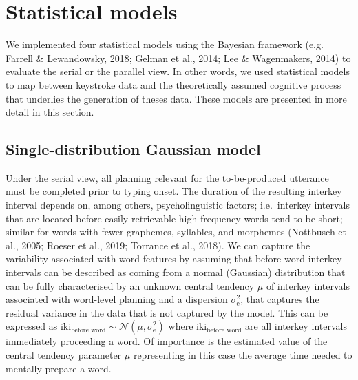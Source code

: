 \documentclass[
  man,floatsintext]{apa7}
\begin{document}
\newpage

\hypertarget{statistical-models}{%
\section{Statistical models}\label{statistical-models}}

We implemented four statistical models using the Bayesian framework (e.g. Farrell \& Lewandowsky, 2018; Gelman et al., 2014; Lee \& Wagenmakers, 2014) to evaluate the serial or the parallel view. In other words, we used statistical models to map between keystroke data and the theoretically assumed cognitive process that underlies the generation of theses data. These models are presented in more detail in this section.

\hypertarget{single-distribution-gaussian-model}{%
\subsection{Single-distribution Gaussian model}\label{single-distribution-gaussian-model}}

Under the serial view, all planning relevant for the to-be-produced utterance must be completed prior to typing onset. The duration of the resulting interkey interval depends on, among others, psycholinguistic factors; i.e.~interkey intervals that are located before easily retrievable high-frequency words tend to be short; similar for words with fewer graphemes, syllables, and morphemes (Nottbusch et al., 2005; Roeser et al., 2019; Torrance et al., 2018). We can capture the variability associated with word-features by assuming that before-word interkey intervals can be described as coming from a normal (Gaussian) distribution that can be fully characterised by an unknown central tendency \(\mu\) of interkey intervals associated with word-level planning and a dispersion \(\sigma_\text{e}^2\), that captures the residual variance in the data that is not captured by the model. This can be expressed as \(\text{iki}_\text{before word} \sim \mathcal{N}(\mu, \sigma_\text{e}^2)\) where \(\text{iki}_\text{before word}\) are all interkey intervals immediately proceeding a word. Of importance is the estimated value of the central tendency parameter \(\mu\) representing in this case the average time needed to mentally prepare a word.
\end{document}
